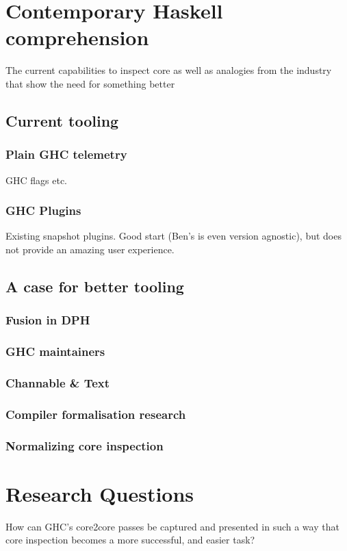 \documentclass{report}
\begin{document}
\chapter{Contemporary Haskell comprehension}
The current capabilities to inspect core as well as analogies from the industry that show the need for something better

\section{Current tooling}
\subsection{Plain GHC telemetry}
GHC flags etc.
\subsection{GHC Plugins}
Existing snapshot plugins. Good start (Ben's is even version agnostic), but does not provide an amazing user experience.

\section{A case for better tooling}
\subsection{Fusion in DPH}
\subsection{GHC maintainers}
\subsection{Channable \& Text}
\subsection{Compiler formalisation research}
\subsection{Normalizing core inspection}

\chapter{Research Questions}

How can GHC’s core2core passes be captured and presented in such a way that core
inspection becomes a more successful, and easier task?
\end{document}
